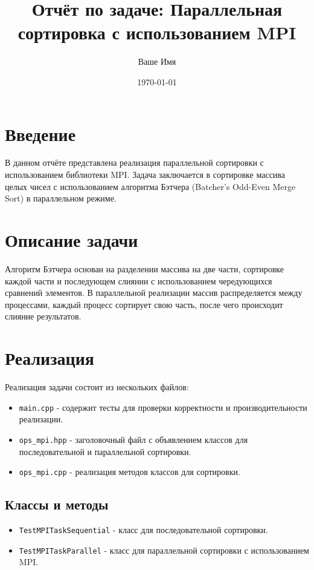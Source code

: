 \documentclass[12pt]{article}
\begin{document}
\title{Отчёт по задаче: Параллельная сортировка с использованием MPI}
\author{Ваше Имя}
\date{\today}
\maketitle

\section{Введение}
В данном отчёте представлена реализация параллельной сортировки с использованием библиотеки MPI. Задача заключается в сортировке массива целых чисел с использованием алгоритма Бэтчера (Batcher's Odd-Even Merge Sort) в параллельном режиме.

\section{Описание задачи}
Алгоритм Бэтчера основан на разделении массива на две части, сортировке каждой части и последующем слиянии с использованием чередующихся сравнений элементов. В параллельной реализации массив распределяется между процессами, каждый процесс сортирует свою часть, после чего происходит слияние результатов.

\section{Реализация}
Реализация задачи состоит из нескольких файлов:
\begin{itemize}
    \item \texttt{main.cpp} - содержит тесты для проверки корректности и производительности реализации.
    \item \texttt{ops\_mpi.hpp} - заголовочный файл с объявлением классов для последовательной и параллельной сортировки.
    \item \texttt{ops\_mpi.cpp} - реализация методов классов для сортировки.
\end{itemize}

\subsection{Классы и методы}
\begin{itemize}
    \item \texttt{TestMPITaskSequential} - класс для последовательной сортировки.
    \item \texttt{TestMPITaskParallel} - класс для параллельной сортировки с использованием MPI.
\end{itemize}
\end{document}
